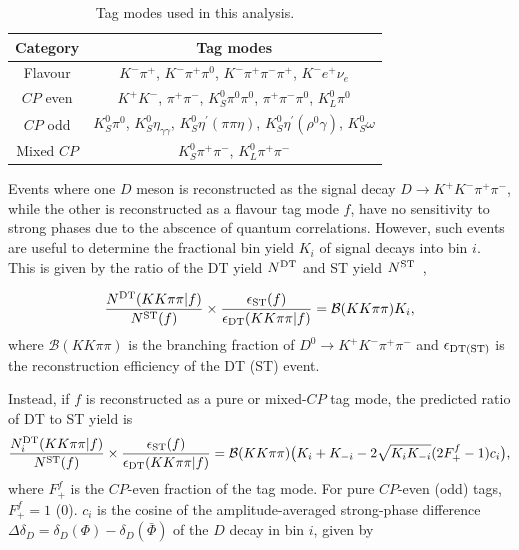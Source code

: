 \documentclass[12pt, a4paper, notitlepage, onecolumn]{article}
\begin{document}
\begin{table}[htb]
    \centering
    \caption{Tag modes used in this analysis.}
    \label{table:Tag_modes}
    \begin{tabular}{cc}
        \hline
        Category     & Tag modes \\
        \hline
        Flavour      & $K^-\pi^+$, $K^-\pi^+\pi^0$, $K^-\pi^+\pi^-\pi^+$, $K^-e^+\nu_e$ \\
        $C\!P$ even  & $K^+K^-$, $\pi^+\pi^-$, $K_S^0\pi^0\pi^0$, $\pi^+\pi^-\pi^0$, $K_L^0\pi^0$ \\
        $C\!P$ odd   & $K_S^0\pi^0$, $K_S^0\eta_{\gamma\gamma}$, $K_S^0\eta^\prime(\pi\pi\eta)$, $K_S^0\eta^\prime(\rho^0\gamma)$, $K_S^0\omega$ \\
        Mixed $C\!P$ & $K_S^0\pi^+\pi^-$, $K_L^0\pi^+\pi^-$ \\
        \hline
    \end{tabular}
\end{table}

Events where one $D$ meson is reconstructed as the signal decay $D\to K^+K^-\pi^+\pi^-$, while the other is reconstructed as a flavour tag mode $f$, have no sensitivity to strong phases due to the abscence of quantum correlations. However, such events are useful to determine the fractional bin yield $K_i$ of signal decays into bin $i$. This is given by the ratio of the DT yield $N^{\rm DT}$ and ST yield $N^{\rm ST}$~\cite{HarnewS4pi},

\begin{equation}
    \frac{N^{\rm DT}(KK\pi\pi | f)}{N^{\rm ST}(f)}\times\frac{\epsilon_{\rm ST}(f)}{\epsilon_{\rm DT}(KK\pi\pi | f)} = \mathcal{B}(KK\pi\pi)K_i,
    \label{equation:Flavour_tag_Ki}
\end{equation}
where $\mathcal{B}(KK\pi\pi)$ is the branching fraction of $D^0\to K^+K^-\pi^+\pi^-$ and $\epsilon_{\rm DT(ST)}$ is the reconstruction efficiency of the DT (ST) event.

Instead, if $f$ is reconstructed as a pure or mixed-$C\!P$ tag mode, the predicted ratio of DT to ST yield is\cite{HarnewS4pi}
\begin{equation}
    \frac{N_i^{\rm DT}(KK\pi\pi | f)}{N^{\rm ST}(f)}\times\frac{\epsilon_{\rm ST}(f)}{\epsilon_{\rm DT}(KK\pi\pi | f)} = \mathcal{B}(KK\pi\pi)\big(K_i + K_{-i} - 2\sqrt{K_iK_{-i}}(2F_+^{f} - 1)c_i\big),
    \label{equation:DT_ST_yield_ratio}
\end{equation}
where $F_+^f$ is the $C\!P$-even fraction of the tag mode. For pure $C\!P$-even (odd) tags, $F_+^f = 1$ ($0$). $c_i$ is the cosine of the amplitude-averaged strong-phase difference $\Delta\delta_D = \delta_D(\Phi) - \delta_D(\bar{\Phi})$ of the $D$ decay in bin $i$, given by
\end{document}
